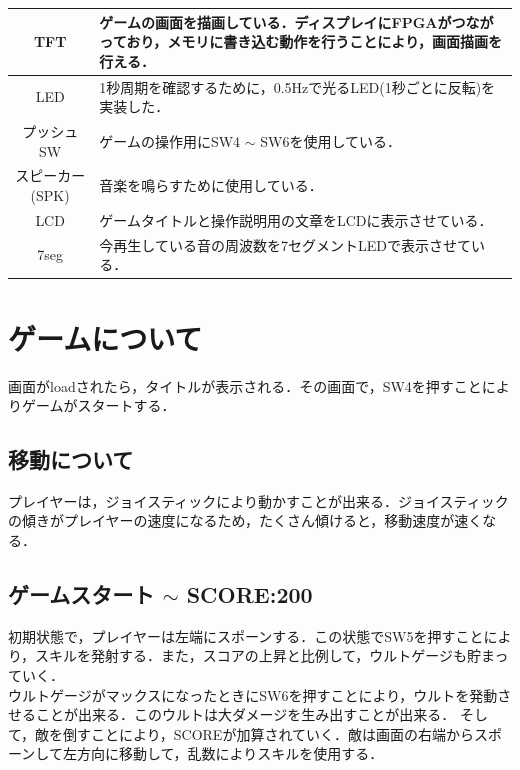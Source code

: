 \documentclass[a4paper,11pt]{ltjsarticle}
\begin{document}
\begin{table}[htbp]
\begin{tabular}{|c|p{10cm}|}
    \hline
    TFT                         & ゲームの画面を描画している．ディスプレイにFPGAがつながっており，メモリに書き込む動作を行うことにより，画面描画を行える．                                                               \\
    \hline
    LED                         & 1秒周期を確認するために，0.5Hzで光るLED(1秒ごとに反転)を実装した．                                                                                      \\
    \hline
    プッシュSW                      & ゲームの操作用にSW4 $\sim$ SW6を使用している．                                                                                               \\
    \hline
    スピーカー(SPK)                  & 音楽を鳴らすために使用している．                                                                                                             \\
    \hline
    LCD                         & ゲームタイトルと操作説明用の文章をLCDに表示させている．                                                                                                \\
    \hline
    7seg                        & 今再生している音の周波数を7セグメントLEDで表示させている．                                                                                              \\
    \hline
  \end{tabular}
\end{table}
\newpage
\section{ゲームについて}
画面がloadされたら，タイトルが表示される．その画面で，SW4を押すことによりゲームがスタートする．
\subsection{移動について}
プレイヤーは，ジョイスティックにより動かすことが出来る．ジョイスティックの傾きがプレイヤーの速度になるため，たくさん傾けると，移動速度が速くなる．
\subsection{ゲームスタート $\sim$ SCORE:200}
初期状態で，プレイヤーは左端にスポーンする．この状態でSW5を押すことにより，スキルを発射する．また，スコアの上昇と比例して，ウルトゲージも貯まっていく．\\
ウルトゲージがマックスになったときにSW6を押すことにより，ウルトを発動させることが出来る．このウルトは大ダメージを生み出すことが出来る．
そして，敵を倒すことにより，SCOREが加算されていく．敵は画面の右端からスポーンして左方向に移動して，乱数によりスキルを使用する．
\end{document}
